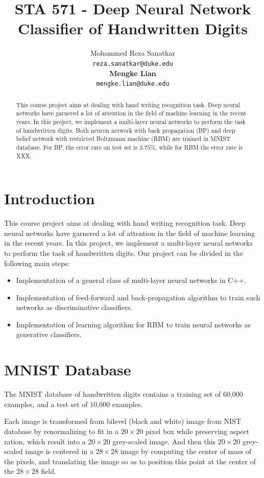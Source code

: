 \documentclass{article} %
\title{STA 571 - Deep Neural Network Classifier of Handwritten Digits}
\author{
Mohammed Reza Sanatkar \\
\texttt{reza.sanatkar@duke.edu} \\
\textbf{Mengke Lian} \\
\texttt{mengke.lian@duke.edu}
}
\begin{document}
\maketitle

\begin{abstract}
This course project aims at dealing with hand writing recognition task.
Deep neural networks have garnered a lot of attention in the field of machine learning in the recent years.
In this project, we implement a multi-layer neural networks to perform the task of handwritten digits.
Both neuron network with back propagation (BP) and deep belief network with restricted Boltzmann machine (RBM) are trained in MNIST database.
For BP, the error rate on test set is $3.75\%$, while for RBM the error rate is XXX.
\end{abstract}

\section{Introduction}

This course project aims at dealing with hand writing recognition task.
Deep neural networks have garnered a lot of attention in the field of machine learning in the recent years. In this project, we implement a multi-layer neural networks to perform the task of handwritten digits. Our project can be divided in the following main steps:

\begin{itemize}
\item   Implementation of a general class of multi-layer neural networks in C++.
\item   Implementation of feed-forward and back-propagation algorithm to train such networks as discriminative classifiers.
\item   Implementation of learning algorithm for RBM to train neural networks as generative classifiers.
\end{itemize}

\section{MNIST Database}

The MNIST database of handwritten digits contains a training set of 60,000 examples, and a test set of 10,000 examples.

Each image is transformed from bilevel (black and white) image from NIST database by renormalizing to fit in a $20\times20$ pixel box while preserving aspect ration, which result into a $20\times20$ grey-scaled image.
And then this $20\times20$ grey-scaled image is centered in a $28\times28$ image by computing the center of mass of the pixels, and translating the image so as to position this point at the center of the $28\times28$ field.
\end{document}
